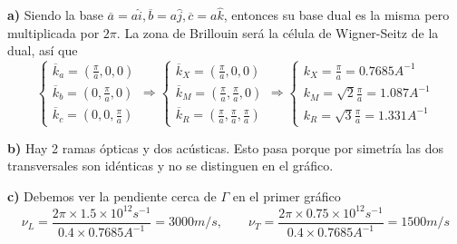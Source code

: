 \documentclass[leqno]{article}
\begin{document}
\textbf{a)} Siendo la base $\overline{a}=a \hat{i}, \overline{b}=a \hat{j}, \overline{c}= a \hat{k}$, entonces su base dual es la misma pero multiplicada por $2\pi$. La zona de Brillouin será la célula de Wigner-Seitz de la dual, así que 
\[
\begin{cases}
  \overline{k}_a = \left( \frac{\pi}{a}, 0, 0 \right) \\ 
  \overline{k}_b = \left( 0, \frac{\pi}{a}, 0 \right) \\
  \overline{k}_c = \left(0,0, \frac{\pi}{a}  \right)
\end{cases} \Rightarrow
\begin{cases}
  \overline{k}_X = \left( \frac{\pi}{a}, 0, 0 \right) \\ 
  \overline{k}_M = \left( \frac{\pi}{a}, \frac{\pi}{a}, 0 \right) \\
  \overline{k}_R = \left( \frac{\pi}{a}, \frac{\pi}{a}, \frac{\pi}{a} \right)
\end{cases} \Rightarrow 
\begin{cases}
  k_X = \frac{\pi}{a} = 0.7685A^{-1}\\
  k_M = \sqrt{2} \frac{\pi}{a} = 1.087A^{-1}\\
  k_R = \sqrt{3} \frac{\pi}{a} = 1.331A^{-1}
\end{cases}
\] 

\textbf{b)} Hay 2 ramas ópticas y dos acústicas. Esto pasa porque por simetría las dos transversales son idénticas y no se distinguen en el gráfico.

\textbf{c)} Debemos ver la pendiente cerca de $\Gamma $ en el primer gráfico
\[
\nu_L = \frac{2\pi \times 1.5\times 10^{12}s^{-1}}{0.4\times 0.7685 A^{-1}} = \boxed{3000m / s}, \qquad 
\nu_T = \frac{2\pi \times 0.75\times 10^{12}s^{-1}}{0.4\times 0.7685 A^{-1}} = \boxed{1500m / s}
\] 
\end{document}
